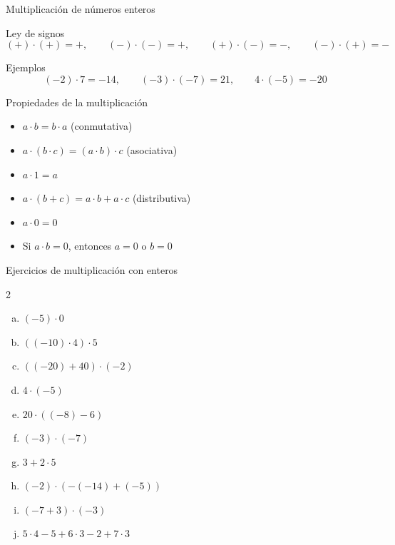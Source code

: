 \documentclass[handout,aspectratio=169,10pt]{beamer}
\begin{document}
	\begin{frame}{Multiplicación de números enteros}
		\begin{block}{Ley de signos}
			\[
			(+)\cdot(+)=+,\qquad (-)\cdot(-)=+,\qquad (+)\cdot(-)=-,\qquad (-)\cdot(+)=-
			\]
		\end{block}
		
		\begin{exampleblock}{Ejemplos}
			\[
			(-2)\cdot 7=-14,\qquad (-3)\cdot(-7)=21,\qquad 4\cdot(-5)=-20
			\]
		\end{exampleblock}
	\end{frame}
	
	\begin{frame}{Propiedades de la multiplicación}
		\begin{itemize}[<+->]
			\item \(a\cdot b=b\cdot a\) \hfill (conmutativa)
			\item \(a\cdot(b\cdot c)=(a\cdot b)\cdot c\) \hfill (asociativa)
			\item \(a\cdot 1=a\)
			\item \(a\cdot(b+c)=a\cdot b+a\cdot c\) \hfill (distributiva)
			\item \(a\cdot 0=0\)
			\item Si \(a\cdot b=0\), entonces \(a=0\) o \(b=0\)
		\end{itemize}
	\end{frame}
	
	\begin{frame}{Ejercicios de multiplicación con enteros}
		\begin{multicols}{2}
			\begin{enumerate}[a)]
				\item \((-5)\cdot 0\)
				\item \(((-10)\cdot 4)\cdot 5\)
				\item \(((-20)+40)\cdot(-2)\)
				\item \(4\cdot(-5)\)
				\item \(20\cdot((-8)-6)\)
				\item \((-3)\cdot(-7)\)
				\item \(3+2\cdot 5\)
				\item \((-2)\cdot(-(-14)+(-5))\)
				\item \((-7+3)\cdot(-3)\)
				\item \(5\cdot4-5+6\cdot3-2+7\cdot3\)
			\end{enumerate}
		\end{multicols}
	\end{frame}
	
\end{document}
